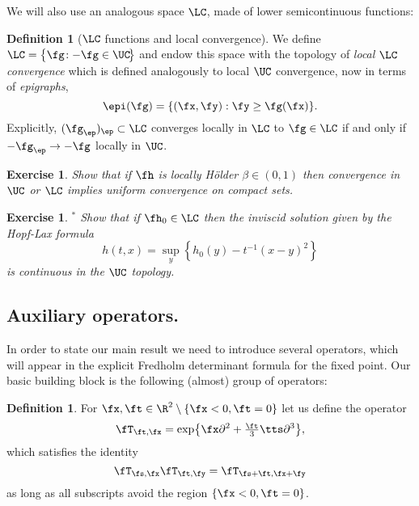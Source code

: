 \documentclass[]{pcmi}
\theoremstyle{plain}
\newtheorem{exercise}[equation]{Exercise}
\theoremstyle{definition}
\newtheorem{definition}[equation]{Definition}
\begin{document}
We will also use an analogous space $\LC$, made of lower semicontinuous functions:

\begin{definition}[$\LC$ functions and local convergence]
We define $\LC=\big\{\fg\!: -\fg\in\UC\!\big\}$ and endow this space with the topology of \emph{local $\LC$ convergence} which is defined analogously to local $\UC$ convergence, now in terms of \emph{epigraphs}, 
\[\epi(\fg) = \{(\fx,\fy): \fy\ge \fg(\fx)\}.\]
Explicitly, $(\fg_\ep)_{\ep} \subset \LC$ converges locally in $\LC$ to $\fg \in \LC$ if and only if $-\fg_\ep\rightarrow-\fg$ locally in $\UC$.
\end{definition}


\begin{exercise}
Show that if $\fh$ is locally H\"older $\beta\in (0,1)$ then convergence in $\UC$ or $\LC$ implies uniform convergence on compact sets.
\end{exercise}
\begin{exercise}$\!\!\!\!{}^*$
Show that if $\fh_0\in \LC$ then the inviscid solution given by the Hopf-Lax formula
\[ h(t,x)=\sup_y\left\{ h_0(y)- t^{-1}(x-y)^2\right\}\]
is continuous in the $\UC$ topology.
\end{exercise}

\subsection{Auxiliary operators.}

In order to state our main result we need to introduce several operators, which will appear in the explicit Fredholm determinant formula for the fixed point. Our basic building block is the following (almost) group of operators:

\begin{definition}\label{def:groupS}
For $\fx,\ft\in\R^2\setminus \{\fx<0, \ft= 0\}$ let us define the operator
\begin{equation}\label{eq:groupS}
\fT_{\ft,\fx}=\exp \bigl\{ \fx\partial^2+\tfrac{\ft}3\tts\partial^3 \bigr\},
\end{equation}
which satisfies the identity
\begin{equation}\label{eq:groupS2}
\fT_{\fs,\fx}\fT_{\ft,\fy}=\fT_{\fs+\ft,\fx+\fy}
\end{equation}
as long as all subscripts avoid the region $\{\fx<0, \ft= 0\}$.
\end{definition}
\end{document}
